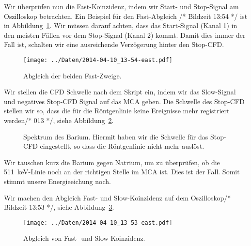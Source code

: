 Wir überprüfen nun die Fast-Koinzidenz, indem wir Start- und Stop-Signal am
Oszilloskop betrachten. Ein Beispiel für den Fast-Abgleich /* Bildzeit 13:54 */
ist in Abbildung~\ref{fig:fast_abgleich_oszi}. Wir müssen darauf achten, dass
das Start-Signal (Kanal 1) in den meisten Fällen vor dem Stop-Signal (Kanal 2)
kommt. Damit dies immer der Fall ist, schalten wir eine ausreichende
Verzögerung hinter den Stop-CFD.

\begin{figure}[htbp]
    \centering
    \texttt{[image: ../Daten/2014-04-10\_13-54-east.pdf]}
    \caption{%
        Abgleich der beiden Fast-Zweige.
    }
    \label{fig:fast_abgleich_oszi}
\end{figure}

Wir stellen die CFD Schwelle nach dem Skript ein, indem wir das Slow-Signal
und negatives Stop-CFD Signal auf das MCA geben. Die Schwelle des Stop-CFD
stellen wir so, dass die für die Röntgenlinie keine Ereignisse mehr registriert
werden/* 013 */, siehe Abbildung~\ref{mca:xray}.

\begin{figure}[htbp]
    \centering
    \caption{%
        Spektrum des Barium. Hiermit haben wir die Schwelle für das Stop-CFD
        eingestellt, so dass die Röntgenlinie nicht mehr auslöst.
    }
    \label{mca:xray}
\end{figure}

Wir tauschen kurz die Barium gegen Natrium, um zu überprüfen, ob die
\SI{511}{\kilo\electronvolt}-Linie noch an der richtigen Stelle im MCA ist.
Dies ist der Fall. Somit stimmt unsere Energieeichung noch.

Wir machen den Abgleich Fast- und Slow-Koinzidenz auf dem Oszilloskop/* Bildzeit
13:53 */, siehe Abbildung~\ref{fig:fast-slow-abgleich}.

\begin{figure}[htbp]
    \centering
    \texttt{[image: ../Daten/2014-04-10\_13-53-east.pdf]}
    \caption{%
        Abgleich von Fast- und Slow-Koinzidenz.
    }
    \label{fig:fast-slow-abgleich}
\end{figure}

